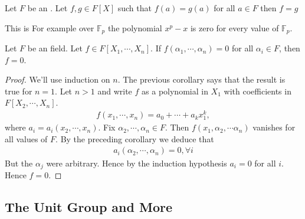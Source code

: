\documentclass{article}
\begin{document}
\begin{cora}
Let $F$ be an . Let $f, g \in F[X]$ such that $f(a)=g(a)$ for all $a \in F$ then $f=g$
\end{cora} 
\begin{rema}
 This is  For example over $\mathbb{F}_{p}$ the polynomial $x^{p}-x$ is zero for every value of $\mathbb{F}_{p}$.
\end{rema}
\begin{thma}
Let $F$ be an  field. Let $f \in F\left[X_{1}, \cdots, X_{n}\right]$. If $f\left(\alpha_{1}, \cdots, \alpha_{n}\right)=0$ for all $\alpha_{i} \in F$, then $f=0$.
\end{thma}
\begin{proof}
We'll use induction on $n$. The previous corollary says that the result is true for $n=1$. Let $n>1$ and write $f$ as a polynomial in $X_{1}$ with coefficients in $F\left[X_{2}, \cdots, X_{n}\right]$.
\begin{align*}
f\left(x_{1}, \cdots, x_{n}\right)=a_{0}+\cdots+a_{k} x_{1}^{k},
\end{align*}
where $a_{i}=a_{i}\left(x_{2}, \cdots, x_{n}\right)$. Fix $\alpha_{2}, \cdots, \alpha_{n} \in F$. Then $f\left(x_{1}, \alpha_{2}, \cdots \alpha_{n}\right)$ vanishes for all values of $F$. By the preceding corollary we deduce that
\begin{align*}
a_{i}\left(\alpha_{2}, \cdots, \alpha_{n}\right)=0, \forall i
\end{align*}
But the $\alpha_{j}$ were arbitrary. Hence by the induction hypothesis $a_{i}=0$ for all $i$. Hence $f=0$.
\end{proof}

\subsection{The Unit Group and More}
\end{document}
